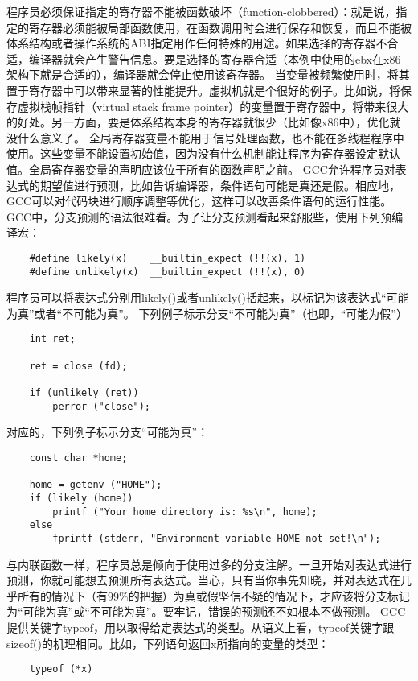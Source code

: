程序员必须保证指定的寄存器不能被函数破坏（function-clobbered）：就是说，指定的寄存器必须能被局部函数使用，在函数调用时会进行保存和恢复，而且不能被体系结构或者操作系统的ABI指定用作任何特殊的用途。如果选择的寄存器不合适，编译器就会产生警告信息。要是选择的寄存器合适（本例中使用的ebx在x86架构下就是合适的），编译器就会停止使用该寄存器。
当变量被频繁使用时，将其置于寄存器中可以带来显著的性能提升。虚拟机就是个很好的例子。比如说，将保存虚拟栈帧指针（virtual stack frame pointer）的变量置于寄存器中，将带来很大的好处。另一方面，要是体系结构本身的寄存器就很少（比如像x86中），优化就没什么意义了。
全局寄存器变量不能用于信号处理函数，也不能在多线程程序中使用。这些变量不能设置初始值，因为没有什么机制能让程序为寄存器设定默认值。全局寄存器变量的声明应该位于所有的函数声明之前。
GCC允许程序员对表达式的期望值进行预测，比如告诉编译器，条件语句可能是真还是假。相应地，GCC可以对代码块进行顺序调整等优化，这样可以改善条件语句的运行性能。
GCC中，分支预测的语法很难看。为了让分支预测看起来舒服些，使用下列预编译宏：
\begin{lstlisting}
    #define likely(x)    __builtin_expect (!!(x), 1)
    #define unlikely(x)  __builtin_expect (!!(x), 0)
\end{lstlisting}
程序员可以将表达式分别用likely()或者unlikely()括起来，以标记为该表达式“可能为真”或者“不可能为真”。
下列例子标示分支“不可能为真”（也即，“可能为假”）
\begin{lstlisting}
    int ret;
    
    ret = close (fd);

    if (unlikely (ret))
        perror ("close");
\end{lstlisting}
对应的，下列例子标示分支“可能为真”：
\begin{lstlisting}
    const char *home;
    
    home = getenv ("HOME");
    if (likely (home))
        printf ("Your home directory is: %s\n", home);
    else
        fprintf (stderr, "Environment variable HOME not set!\n");
\end{lstlisting}

与内联函数一样，程序员总是倾向于使用过多的分支注解。一旦开始对表达式进行预测，你就可能想去预测所有表达式。当心，只有当你事先知晓，并对表达式在几乎所有的情况下（有99\%的把握）为真或假坚信不疑的情况下，才应该将分支标记为“可能为真”或“不可能为真”。要牢记，错误的预测还不如根本不做预测。
GCC提供关键字typeof，用以取得给定表达式的类型。从语义上看，typeof关键字跟sizeof()的机理相同。比如，下列语句返回x所指向的变量的类型：
\begin{lstlisting}
    typeof (*x)
\end{lstlisting}

